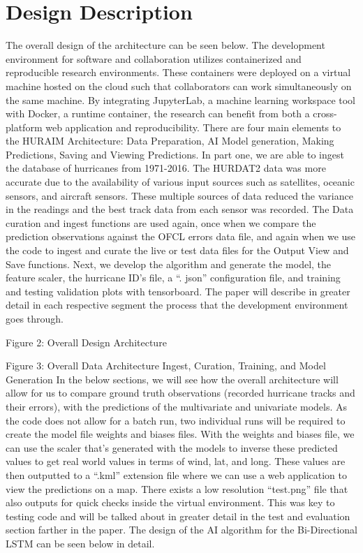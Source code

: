 \documentclass{article}
\begin{document}
\section{Design Description}
The overall design of the architecture can be seen below. The development environment for software and collaboration utilizes containerized and reproducible research environments. These containers were deployed on a virtual machine hosted on the cloud such that collaborators can work simultaneously on the same machine. By integrating JupyterLab, a machine learning workspace tool with Docker, a runtime container, the research can benefit from both a cross-platform web application and reproducibility. There are four main elements to the HURAIM Architecture: Data Preparation, AI Model generation, Making Predictions, Saving and Viewing Predictions. In part one, we are able to ingest the database of hurricanes from 1971-2016. The HURDAT2 data was more accurate due to the availability of various input sources such as satellites, oceanic sensors, and aircraft sensors. These multiple sources of data reduced the variance in the readings and the best track data from each sensor was recorded. The Data curation and ingest functions are used again, once when we compare the prediction observations against the OFCL errors data file, and again when we use the code to ingest and curate the live or test data files for the Output View and Save functions. Next, we develop the algorithm and generate the model, the feature scaler, the hurricane ID’s file, a “. json” configuration file, and training and testing validation plots with tensorboard. The paper will describe in greater detail in each respective segment the process that the development environment goes through.


Figure 2: Overall Design Architecture


Figure 3: Overall Data Architecture Ingest, Curation, Training, and Model Generation
In the below sections, we will see how the overall architecture will allow for us to compare ground truth observations (recorded hurricane tracks and their errors), with the predictions of the multivariate and univariate models. As the code does not allow for a batch run, two individual runs will be required to create the model file weights and biases files. With the weights and biases file, we can use the scaler that’s generated with the models to inverse these predicted values to get real world values in terms of wind, lat, and long. These values are then outputted to a “.kml” extension file where we can use a web application to view the predictions on a map. There exists a low resolution “test.png” file that also outputs for quick checks inside the virtual environment. This was key to testing code and will be talked about in greater detail in the test and evaluation section farther in the paper. The design of the AI algorithm for the Bi-Directional LSTM can be seen below in detail.
\end{document}
